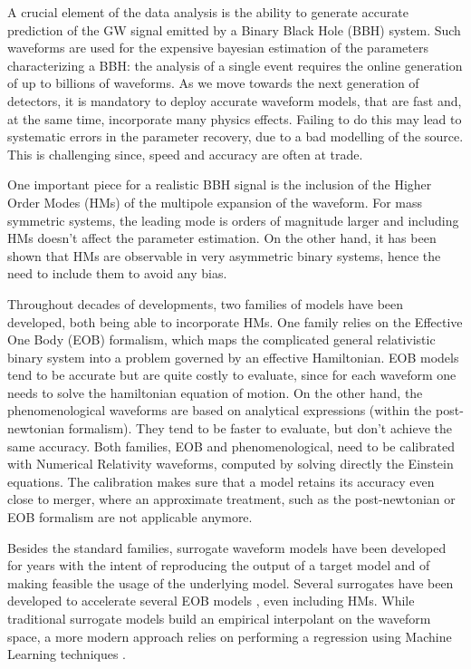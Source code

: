 \documentclass[twocolumn,showpacs,preprintnumbers,nofootinbib,prd,
superscriptaddress,10pt]{revtex4-1}
\begin{document}
A crucial element of the data analysis is the ability to generate accurate prediction of the GW signal emitted by a Binary Black Hole (BBH) system. Such waveforms are used for the expensive bayesian estimation of the parameters characterizing a BBH: the analysis of a single event requires the online generation of up to billions of waveforms.
As we move towards the next generation of detectors, it is mandatory to deploy accurate waveform models, that are fast and, at the same time, incorporate many physics effects. Failing to do this may lead to systematic errors in the parameter recovery, due to a bad modelling of the source.
This is challenging since, speed and accuracy are often at trade.

One important piece for a realistic BBH signal is the inclusion of the Higher Order Modes (HMs) of the multipole expansion of the waveform. For mass symmetric systems, the leading mode is orders of magnitude larger and including HMs doesn't affect the parameter estimation. On the other hand, it has been shown \cite{} that HMs are observable in very asymmetric binary systems, hence the need to include them to avoid any bias.

Throughout decades of developments, two families of models have been developed, both being able to incorporate HMs.
One family relies on the Effective One Body (EOB) formalism, which maps the complicated general relativistic binary system into a problem governed by an effective Hamiltonian. EOB models tend to be accurate but are quite costly to evaluate, since for each waveform one needs to solve the hamiltonian equation of motion.
On the other hand, the phenomenological waveforms are based on analytical expressions (within the post-newtonian formalism). They tend to be faster to evaluate, but don't achieve the same accuracy.
Both families, EOB and phenomenological, need to be calibrated with Numerical Relativity waveforms, computed by solving directly the Einstein equations. The calibration makes sure that a model retains its accuracy even close to merger, where an approximate treatment, such as the post-newtonian or EOB formalism are not applicable anymore.

Besides the standard families, surrogate waveform models have been developed for years with the intent of reproducing the output of a target model and of making feasible the usage of the underlying model. Several surrogates have been developed to accelerate several EOB models \cite{Gadre:2022sed}, even including HMs. While traditional surrogate models \cite{} build an empirical interpolant on the waveform space, a more modern approach relies on performing a regression using Machine Learning techniques \cite{}.
\end{document}
